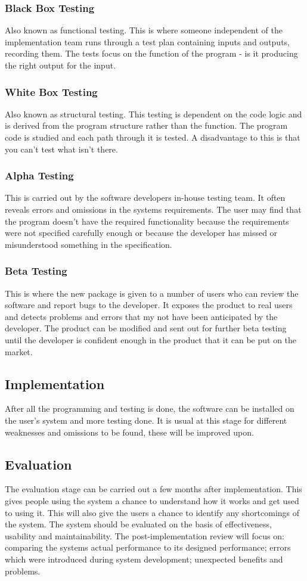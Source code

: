 \documentclass[a4paper,11pt, twocolumn]{article}
\begin{document}
\subsubsection{Black Box Testing}
Also known as functional testing. This is where someone independent of the implementation team runs through a test plan containing inputs and outputs, recording them. The tests focus on the function of the program - is it producing the right output for the input.
\subsubsection{White Box Testing}
Also known as structural testing. This testing is dependent on the code logic and is derived from the program structure rather than the function. The program code is studied and each path through it is tested. A disadvantage to this is that you can't test what isn't there.
\subsubsection{Alpha Testing}
This is carried out by the software developers in-house testing team. It often reveals errors and omissions in the systems requirements. The user may find that the program doesn't have the required functionality because the requirements were not specified carefully enough or because the developer has missed or misunderstood something in the specification. 
\subsubsection{Beta Testing}
This is where the new package is given to a number of users who can review the software and report bugs to the developer. It exposes the product to real users and detects problems and errors that my not have been anticipated by the developer. The product can be modified and sent out for further beta testing until the developer is confident enough in the product that it can be put on the market.
\subsection{Implementation}
After all the programming and testing is done, the software can be installed on the user's system and more testing done. It is usual at this stage for different weaknesses and omissions to be found, these will be improved upon.
\subsection{Evaluation}
The evaluation stage can be carried out a few months after implementation. This gives people using the system a chance to understand how it works and get used to using it. This will also give the users a chance to identify any shortcomings of the system. The system should be evaluated on the basis of effectiveness, usability and maintainability. The post-implementation review will focus on: comparing the systems actual performance to its designed performance; errors which were introduced during system development; unexpected benefits and problems.
\end{document}
